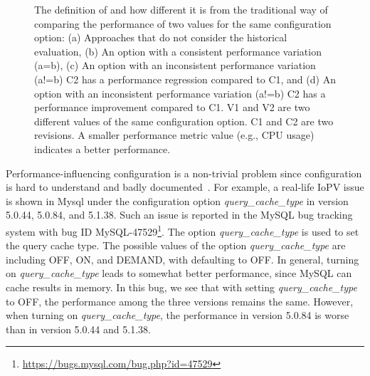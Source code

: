 \begin{figure}[t]
{	The definition of \inconsistent and how different it is from the traditional way of comparing the performance of two values for the same configuration option: (a) Approaches that do not consider the historical evaluation, (b) An option with a consistent performance variation (a=b), (c) An option with an inconsistent performance variation (a!=b) C2 has a performance regression compared to C1, and (d) An option with an inconsistent performance variation (a!=b) C2 has a performance improvement compared to C1. V1 and V2 are two different values of the same configuration option. C1 and C2 are two revisions. A smaller performance metric value (e.g., CPU usage) indicates a better performance.
	}
	\label{fig:description}
\end{figure}


Performance-influencing configuration is a non-trivial problem since configuration is hard to understand and badly documented~\cite{DBLP:conf/eurosys/LiWHL20}. For example, a real-life IoPV issue is shown in Mysql under the configuration option \emph{query\_cache\_type} in version 5.0.44, 5.0.84, and 5.1.38. Such an issue is reported in the MySQL bug tracking system with bug ID MySQL-47529\footnote{\url{https://bugs.mysql.com/bug.php?id=47529}}. The option \emph{query\_cache\_type} is used to set the query cache type. The possible values of the option \emph{query\_cache\_type} are including OFF, ON, and DEMAND, with defaulting to OFF. In general, turning on \emph{query\_cache\_type} leads to somewhat better performance, since MySQL can cache results in memory. In this bug, we see that with setting  \emph{query\_cache\_type} to OFF, the performance among the three versions remains the same. However, when turning on \emph{query\_cache\_type}, the performance in version 5.0.84 is worse than in version 5.0.44 and 5.1.38.

